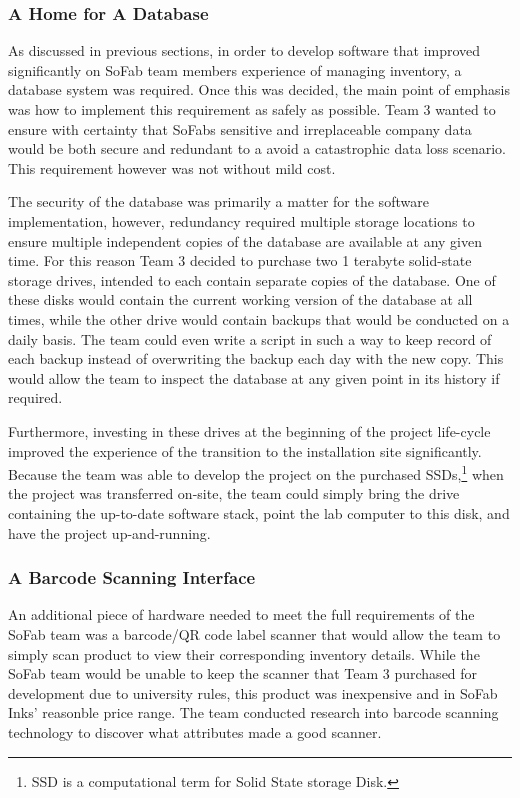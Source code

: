 \documentclass{article}
\begin{document}
\subsubsection{A Home for A Database}
\label{sec:server}
As discussed in previous sections, in order to develop software that improved significantly on SoFab team members experience of managing
inventory, a database system was required. Once this was decided, the main point of emphasis was how to implement this requirement as 
safely as possible. Team 3 wanted to ensure with certainty that SoFabs sensitive and irreplaceable company data would be both secure 
and redundant to a avoid a catastrophic data loss scenario. This requirement however was not without mild cost. 

The security of the database was primarily a matter for the software implementation, however, redundancy required multiple storage locations
to ensure multiple independent copies of the database are available at any given time. For this reason Team 3 decided to purchase two 
1 terabyte solid-state storage drives, intended to each contain separate copies of the database. One of these disks would contain the 
current working version of the database at all times, while the other drive would contain backups that would be conducted on a daily 
basis. The team could even write a script in such a way to keep record of each backup instead of overwriting the backup each day with the 
new copy. This would allow the team to inspect the database at any given point in its history if required. 

Furthermore, investing in these drives at the beginning of the project life-cycle improved the experience of the transition to the 
installation site significantly. Because the team was able to develop the project on the purchased SSDs,\footnote{SSD is a computational
term for Solid State storage Disk.} when the project was transferred on-site, the team could simply bring the drive containing the up-to-date
software stack, point the lab computer to this disk, and have the project up-and-running. 
\subsubsection{A Barcode Scanning Interface} 
An additional piece of hardware needed to meet the full requirements of the SoFab team was a barcode\slash QR code label scanner that 
would allow the team to simply scan product to view their corresponding inventory details. While the SoFab team would be unable to keep 
the scanner that Team 3 purchased for development due to university rules, this product was inexpensive and in SoFab Inks' reasonble price
range. The team conducted research into barcode scanning technology to discover what attributes made a good scanner. 
\end{document}
